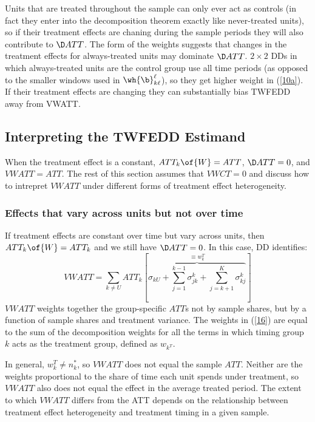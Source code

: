 \documentclass[12pt]{article}
\theoremstyle{definition}
\begin{document}
Units that are treated throughout the sample can only ever act as controls (in fact they enter into the decomposition theorem exactly like never-treated units), so if their treatment effects are chaning during the sample periods they will also contribute to $\D ATT$. The form of the weights suggests that changes in the treatment effects for always-treated units may dominate $\D ATT$. $2\times2$ DDs in which always-treated units are the control group use all time periods (as opposed to the smaller windows used in $\wh{\b}_{k\ell}^{\ell}$), so they get higher weight in (\ref{10a}). If their treatment effects are changing they can substantially bias TWFEDD away from VWATT. 

\subsection{Interpreting the TWFEDD Estimand}

When the treatment effect is a constant, $ATT_k\of{W} = ATT$, $\D ATT = 0$, and $VWATT = ATT$. The rest of this section assumes that $VWCT = 0$ and discuss how to intrepret $VWATT$ under different forms of treatment effect heterogeneity.

\subsubsection{Effects that vary across units but not over time}

If treatment effects are constant over time but vary across units, then $ATT_k\of{W} = ATT_k$ and we still have $\D ATT = 0$. In this case, DD identifies:
\begin{equation}
    \label{16}
    VWATT = \sum_{k \neq U} ATT_k \left[\overbrace{\sigma_{k U}+\sum_{j=1}^{k-1} \sigma_{j k}^k+\sum_{j=k+1}^K \sigma_{k j}^k}^{\equiv w_k^T}\right]
\end{equation}
$VWATT$ weights together the group-specific $ATT$s not by sample shares, but by a function of sample shares and treatment variance. The weights in (\ref{16}) are equal to the sum of the decomposition weights for all the terms in which timing group $k$ acts as the treatment group, defined as $w_{k^T}$.

In general, $w_k^T \neq n_k^*$, so $VWATT$ does not equal the sample $ATT$. Neither are the weights proportional to the share of time each unit spends under treatment, so $VWATT$ also does not equal the effect in the average treated period. The extent to which $VWATT$ differs from the ATT depends on the relationship between treatment effect heterogeneity and treatment timing in a given sample.
\end{document}
